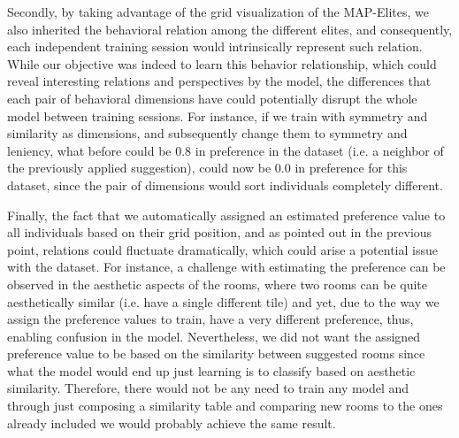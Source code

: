 Secondly, by taking advantage of the grid visualization of the MAP-Elites, we also inherited the behavioral relation among the different elites, and consequently, each independent training session would intrinsically represent such relation. While our objective was indeed to learn this behavior relationship, which could reveal interesting relations and perspectives by the model, the differences that each pair of behavioral dimensions have could potentially disrupt the whole model between training sessions. For instance, if we train with symmetry and similarity as dimensions, and subsequently change them to symmetry and leniency, what before could be 0.8 in preference in the dataset (i.e. a neighbor of the previously applied suggestion), could now be 0.0 in preference for this dataset, since the pair of dimensions would sort individuals completely different.

Finally, the fact that we automatically assigned an estimated preference value to all individuals based on their grid position, and as pointed out in the previous point, relations could fluctuate dramatically, which could arise a potential issue with the dataset. For instance, a challenge with estimating the preference can be observed in the aesthetic aspects of the rooms, where two rooms can be quite aesthetically similar (i.e. have a single different tile) and yet, due to the way we assign the preference values to train, have a very different preference, thus, enabling confusion in the model. Nevertheless, we did not want the assigned preference value to be based on the similarity between suggested rooms since what the model would end up just learning is to classify based on aesthetic similarity. Therefore, there would not be any need to train any model and through just composing a similarity table and comparing new rooms to the ones already included we would probably achieve the same result.%


